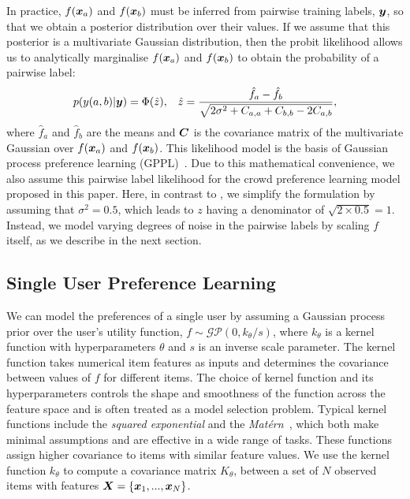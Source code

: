 In practice, $f(\boldsymbol x_a)$ and $f(\boldsymbol x_b)$ must be inferred from
pairwise training labels, $\boldsymbol y$,
so that we obtain a posterior distribution over their values.
If we assume that this posterior is a multivariate Gaussian distribution,
then the probit likelihood allows us to analytically marginalise 
$f(\boldsymbol x_a)$ and $f(\boldsymbol x_b)$
to obtain the probability of a pairwise label:
\begin{align}
p(y(a,b)| \boldsymbol y) 
= \Phi(\hat{z}),& & \hat{z} = \frac{\hat{f}_a - \hat{f}_b}{\sqrt{2\sigma^2 + C_{a,a} + C_{b,b} 
- 2C_{a,b}} }, \label{eq:predict_z}
\end{align}
where $\hat{f}_a$ and $\hat{f}_b$ are the means and
$\boldsymbol C$ is the covariance matrix of the multivariate Gaussian over
$f(\boldsymbol x_a)$ and $f(\boldsymbol x_b)$.
This likelihood model is the basis of Gaussian process preference learning (GPPL)~\citep{chu2005preference}. 
Due to this mathematical convenience,
we also assume this pairwise label likelihood for the crowd
preference learning model proposed in this paper.
Here, in contrast to \citet{chu2005preference},
we simplify the formulation by assuming that $\sigma^2 = 0.5$,
which leads to $z$ having a denominator of $\sqrt{2 \times 0.5}=1$.
Instead, we model varying degrees of noise in the pairwise labels
by scaling $f$ itself, as we describe in the next section.


\subsection{Single User Preference Learning}
We can model the preferences of a single user by assuming
a Gaussian process prior over the user's utility function, 
$f \sim \mathcal{GP}(0, k_{\theta}/s)$, where $k_{\theta}$ is a kernel function with hyperparameters $\theta$
and $s$ is an inverse scale parameter.
The kernel function takes numerical item features as inputs and determines the covariance between values of $f$ for different items. 
The choice of kernel function and its hyperparameters controls the shape and smoothness of the function 
across the feature space and is often treated as a model selection problem.
Typical kernel functions include the \emph{squared exponential} 
and the \emph{Mat\'ern}~\citep{rasmussen_gaussian_2006},
which both make minimal assumptions and are effective in a wide range of tasks. 
These functions assign higher covariance to items with similar feature values.
We use the kernel function $k_{\theta}$ to compute a covariance matrix $K_{\theta}$,
between a set of $N$ observed items with features $\boldsymbol X = \{ \boldsymbol x_1, ..., \boldsymbol x_N \}$.

